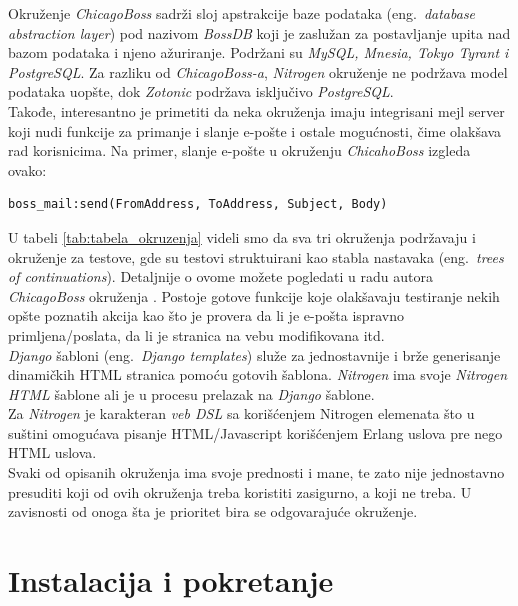 \documentclass[a4paper]{article}
\begin{document}
{Okruženje {\em ChicagoBoss} sadrži sloj apstrakcije baze podataka (eng.~{\em database abstraction layer}) pod nazivom {\em BossDB} \cite{ChicagoBossDocumentation} koji je zaslužan za postavljanje upita nad bazom podataka i njeno ažuriranje. Podržani su {\em MySQL, Mnesia, Tokyo Tyrant i PostgreSQL}. Za razliku od {\em ChicagoBoss-a}, {\em Nitrogen} okruženje ne podržava model podataka uopšte, dok {\em Zotonic} \cite{ZotonicDocumentation} podržava isključivo {\em PostgreSQL}.\\

Takođe, interesantno je primetiti da neka okruženja imaju integrisani mejl server koji nudi funkcije za primanje i slanje e-pošte i ostale mogućnosti, čime olakšava rad korisnicima. Na primer, slanje e-pošte u okruženju {\em ChicahoBoss} izgleda ovako:

\begin{verbatim}
boss_mail:send(FromAddress, ToAddress, Subject, Body)
\end{verbatim} 

U tabeli \ref{tab:tabela_okruzenja} videli smo da sva tri okruženja podržavaju i okruženje za testove, gde su testovi struktuirani kao stabla nastavaka (eng.~{\em trees of continuations}). Detaljnije o ovome možete pogledati u radu autora {\em ChicagoBoss} okruženja \cite{EvanMillerTesting}. Postoje gotove funkcije koje olakšavaju testiranje nekih opšte poznatih akcija kao što je provera da li je e-pošta ispravno primljena/poslata, da li je stranica na vebu modifikovana itd. \\

{\em Django} šabloni (eng.~{\em Django templates}) \cite{DjangoTempDoc} služe za jednostavnije i brže generisanje dinamičkih HTML stranica pomoću gotovih šablona. {\em Nitrogen} ima svoje {\em Nitrogen HTML} šablone ali je u procesu prelazak na {\em Django} šablone. \\

Za {\em Nitrogen} \cite{NitrogenDocumentation} je karakteran {\em veb DSL} \cite{WebDSL} sa korišćenjem Nitrogen elemenata \cite{NitrogenDocumentation} što u suštini omogućava pisanje HTML/Javascript korišćenjem Erlang uslova pre nego HTML uslova. \\

Svaki od opisanih okruženja ima svoje prednosti i mane, te zato nije jednostavno presuditi koji od ovih okruženja treba koristiti zasigurno, a koji ne treba. U zavisnosti od onoga šta je prioritet bira se odgovarajuće okruženje.

\section{Instalacija i pokretanje}
\label{sec:instalacija}

}
\end{document}
